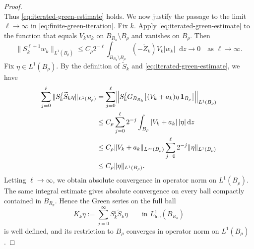 \documentclass[11pt]{article}
\numberwithin{equation}{section}
\theoremstyle{remark}
\newcommand{\dd}{\mathop{}\!\mathrm{d}}
\begin{document}
\begin{proof}
{\[\]
}
 Thus \eqref{eq:iterated-green-estimate} holds.  We now justify the passage to the limit
$\ell\to\infty$ in \eqref{eq:finite-green-iteration}.
Fix $k$.  Apply \eqref{eq:iterated-green-estimate} to the function that
equals $V_kw_k$ on $B_{R_k}\setminus B_\rho$ and vanishes on $B_\rho$.
Then
{
\[
 \|S_k^{\ell+1}w_k\|_{L^1(B_\rho)}
 \le C_\rho 2^{-\ell}
 \int_{B_{R_k}\setminus B_\rho}
 (-\widetilde Z_k)V_k|w_k|\dd z\to0
 \quad\text{as }\ell\to\infty.
\]
}
 Fix $\eta\in L^1(B_\rho)$.  By the
definition of $\widetilde S_k$ and
\eqref{eq:iterated-green-estimate}, we have
{
\[
\begin{aligned}
 \sum_{j=0}^{\ell}
 \|S_k^j\widetilde S_k\eta\|_{L^1(B_\rho)}
 &=\sum_{j=0}^{\ell}
 \Bigl\|S_k^jG_{B_{R_k}}
 \big[(V_k+a_k)\eta\,\mathbf 1_{B_\rho}\big]
 \Bigr\|_{L^1(B_\rho)}\\
 &\le C_\rho\sum_{j=0}^{\ell}2^{-j}
 \int_{B_\rho}|V_k+a_k|\,|\eta|\dd z\\
 &\le C_\rho\|V_k+a_k\|_{L^\infty(B_\rho)}
 \sum_{j=0}^{\ell}2^{-j}
 \|\eta\|_{L^1(B_\rho)}\\
 &\le C_\rho\|\eta\|_{L^1(B_\rho)}.
\end{aligned}
\]
}
{Letting \(\ell\to\infty\), we obtain absolute convergence in operator
norm on \(L^1(B_\rho)\). The same integral estimate gives absolute
convergence on every ball compactly contained in \(B_{R_k}\). Hence the
Green series on the full ball}
{
\begin{equation}\label{eq:fixed-core-green-series}
 K_k\eta:=\sum_{j=0}^{\infty}S_k^j\widetilde S_k\eta
 \qquad\text{in }L^1_{\mathrm{loc}}(B_{R_k})
\end{equation}
}
is well defined, and its restriction to $B_\rho$ converges in operator
norm on $L^1(B_\rho)$.


\end{proof}
\end{document}
